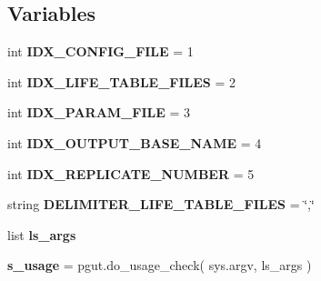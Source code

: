 \subsection*{Variables}
\begin{DoxyCompactItemize}
\item 
int {\bfseries I\+D\+X\+\_\+\+C\+O\+N\+F\+I\+G\+\_\+\+F\+I\+LE} = 1\hypertarget{namespacenegui_1_1do__sim__replicate_a69934e9639d56ee22af7c8754ae96f9e}{}\label{namespacenegui_1_1do__sim__replicate_a69934e9639d56ee22af7c8754ae96f9e}

\item 
int {\bfseries I\+D\+X\+\_\+\+L\+I\+F\+E\+\_\+\+T\+A\+B\+L\+E\+\_\+\+F\+I\+L\+ES} = 2\hypertarget{namespacenegui_1_1do__sim__replicate_a4911fd1a910de8d0e270ecd683aa4cfd}{}\label{namespacenegui_1_1do__sim__replicate_a4911fd1a910de8d0e270ecd683aa4cfd}

\item 
int {\bfseries I\+D\+X\+\_\+\+P\+A\+R\+A\+M\+\_\+\+F\+I\+LE} = 3\hypertarget{namespacenegui_1_1do__sim__replicate_ad5ef63e71f09424ccfe5378b3f2ead6d}{}\label{namespacenegui_1_1do__sim__replicate_ad5ef63e71f09424ccfe5378b3f2ead6d}

\item 
int {\bfseries I\+D\+X\+\_\+\+O\+U\+T\+P\+U\+T\+\_\+\+B\+A\+S\+E\+\_\+\+N\+A\+ME} = 4\hypertarget{namespacenegui_1_1do__sim__replicate_af6e33a201e67102ffbaa37d84327a26c}{}\label{namespacenegui_1_1do__sim__replicate_af6e33a201e67102ffbaa37d84327a26c}

\item 
int {\bfseries I\+D\+X\+\_\+\+R\+E\+P\+L\+I\+C\+A\+T\+E\+\_\+\+N\+U\+M\+B\+ER} = 5\hypertarget{namespacenegui_1_1do__sim__replicate_a3b9681f65f2fd7794f62a8a2994e9e5d}{}\label{namespacenegui_1_1do__sim__replicate_a3b9681f65f2fd7794f62a8a2994e9e5d}

\item 
string {\bfseries D\+E\+L\+I\+M\+I\+T\+E\+R\+\_\+\+L\+I\+F\+E\+\_\+\+T\+A\+B\+L\+E\+\_\+\+F\+I\+L\+ES} = \char`\"{},\char`\"{}\hypertarget{namespacenegui_1_1do__sim__replicate_a17d79e8cc7b50444c7510a3c5ebdaaf3}{}\label{namespacenegui_1_1do__sim__replicate_a17d79e8cc7b50444c7510a3c5ebdaaf3}

\item 
list {\bfseries ls\+\_\+args}
\item 
{\bfseries s\+\_\+usage} = pgut.\+do\+\_\+usage\+\_\+check( sys.\+argv, ls\+\_\+args )\hypertarget{namespacenegui_1_1do__sim__replicate_a875f5098174c64976261bdc5bb0f4355}{}\label{namespacenegui_1_1do__sim__replicate_a875f5098174c64976261bdc5bb0f4355}


\end{DoxyCompactItemize}
